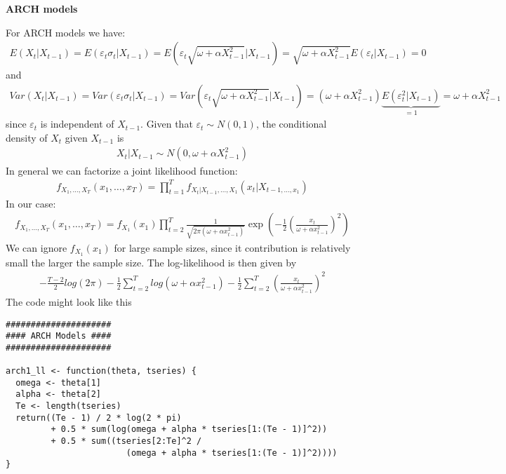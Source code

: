 \begin{Solution}{12.11}
\textbf{ARCH models}

For ARCH models we have:
\begin{align*}
E(X_t|X_{t-1}) = E(\varepsilon_t \sigma_t|X_{t-1}) = E(\varepsilon_t\sqrt{\omega+\alpha X_{t-1}^2}|X_{t-1}) =\sqrt{\omega+\alpha X_{t-1}^2} E(\varepsilon_t|X_{t-1}) = 0
\end{align*}
and
\begin{align*}
Var(X_t|X_{t-1}) = Var(\varepsilon_t \sigma_t|X_{t-1}) = Var(\varepsilon_t\sqrt{\omega+\alpha X_{t-1}^2}|X_{t-1}) = (\omega+\alpha X_{t-1}^2)\underbrace{E(\varepsilon_t^2|X_{t-1})}_{=1} = \omega+\alpha X_{t-1}^2
\end{align*}
since $\varepsilon_t$ is independent of $X_{t-1}$. Given that $\varepsilon_t \sim N(0,1)$, the conditional density of $X_t$ given $X_{t-1}$ is
\begin{align*}
X_t|X_{t-1} \sim N(0,\omega+\alpha X_{t-1}^2)
\end{align*}
In general we can factorize a joint likelihood function:
\begin{align*}
  f_{X_1,\dots,X_T}(x_1,\dots,x_T) = \prod_{t=1}^{T}f_{X_t|X_{t-1},\dots,X_1}(x_t|X_{t-1,\dots,x_1})
\end{align*}
In our case:
\begin{align*}
  f_{X_1,\dots,X_T}(x_1,\dots,x_T) = f_{X_1}(x_1)\prod_{t=2}^{T}\frac{1}{\sqrt{2\pi(\omega+\alpha x_{t-1}^2)}}\exp\left(-\frac{1}{2}\left(\frac{x_t}{\omega+\alpha x_{t-1}^2}\right)^2\right)
\end{align*}
We can ignore $f_{X_1}(x_1)$ for large sample sizes, since it contribution is relatively small the larger the sample size. The log-likelihood is then given by
\begin{align*}
  -\frac{T-2}{2}log(2\pi)-\frac{1}{2}\sum_{t=2}^{T}log(\omega+\alpha x_{t-1}^2) - \frac{1}{2} \sum_{t=2}^{T} \left(\frac{x_t}{\omega+\alpha x_{t-1}^2}\right)^2
\end{align*}
The code might look like this
\begin{verbatim}
#####################
#### ARCH Models ####
#####################

arch1_ll <- function(theta, tseries) {
  omega <- theta[1]
  alpha <- theta[2]
  Te <- length(tseries)
  return((Te - 1) / 2 * log(2 * pi)
         + 0.5 * sum(log(omega + alpha * tseries[1:(Te - 1)]^2))
         + 0.5 * sum((tseries[2:Te]^2 /
                        (omega + alpha * tseries[1:(Te - 1)]^2))))
}


\end{verbatim}
\end{Solution}

